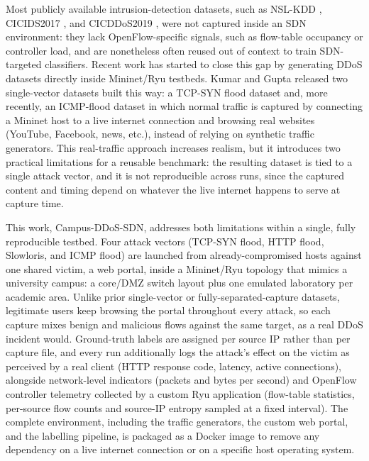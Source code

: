 \documentclass[a4paper,fleqn]{cas-dc}
\begin{document}
Most publicly available intrusion-detection datasets, such as
NSL-KDD \citep{tavallaee2009nslkdd}, CICIDS2017
\citep{sharafaldin2018cicflowmeter}, and CICDDoS2019
\citep{sharafaldin2019cicddos2019}, were not captured inside an SDN
environment: they lack OpenFlow-specific signals, such as flow-table
occupancy or controller load, and are nonetheless often reused out of
context to train SDN-targeted classifiers. Recent work has started to
close this gap by generating DDoS datasets directly inside Mininet/Ryu
testbeds. Kumar and Gupta released two single-vector datasets built
this way: a TCP-SYN flood dataset \citep{kumar2025synflood} and, more
recently, an ICMP-flood dataset \citep{kumar2026icmpfloodsdn} in which
normal traffic is captured by connecting a Mininet host to a live
internet connection and browsing real websites (YouTube, Facebook,
news, etc.), instead of relying on synthetic traffic generators. This
real-traffic approach increases realism, but it introduces two
practical limitations for a reusable benchmark: the resulting dataset
is tied to a single attack vector, and it is not reproducible across
runs, since the captured content and timing depend on whatever the
live internet happens to serve at capture time.

This work, Campus-DDoS-SDN, addresses both limitations within a
single, fully reproducible testbed. Four attack vectors (TCP-SYN
flood, HTTP flood, Slowloris, and ICMP flood) are launched from
already-compromised hosts against one shared victim, a web portal,
inside a Mininet/Ryu topology that mimics a university campus: a
core/DMZ switch layout plus one emulated laboratory per academic
area. Unlike prior single-vector or fully-separated-capture datasets,
legitimate users keep browsing the portal throughout every attack, so
each capture mixes benign and malicious flows against the same
target, as a real DDoS incident would. Ground-truth labels are
assigned per source IP rather than per capture file, and every run
additionally logs the attack's effect on the victim as perceived by a
real client (HTTP response code, latency, active connections),
alongside network-level indicators (packets and bytes per second) and
OpenFlow controller telemetry collected by a custom Ryu application
(flow-table statistics, per-source flow counts and source-IP entropy
sampled at a fixed interval). The complete environment, including the
traffic generators, the custom web portal, and the labelling
pipeline, is packaged as a Docker image to remove any dependency on a
live internet connection or on a specific host operating system.
\end{document}
